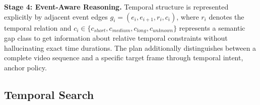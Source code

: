 \documentclass[runningheads]{llncs}
\begin{document}
\textbf{Stage 4: Event-Aware Reasoning.} Temporal structure is represented explicitly by adjacent event edges $
    g_i =
    \left(
        e_i,
        e_{i+1},
        r_i,
        c_i
    \right)$, where $r_i$ denotes the temporal relation and
$c_i \in
\{c_{short}, c_{medium}, c_{long},c_{unknown}\}$
represents a semantic gap class to get information about relative
temporal constraints without hallucinating exact time durations. The plan additionally distinguishes between a complete video sequence and a specific target frame through temporal intent, anchor policy.












\subsection{Temporal Search}
\label{sec:search}
\end{document}
